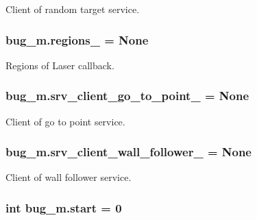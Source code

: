 Client of random target service. 

\subsubsection[{\texorpdfstring{regions\+\_\+}{regions_}}]{\setlength{\rightskip}{0pt plus 5cm}bug\+\_\+m.\+regions\+\_\+ = None}\hypertarget{namespacebug__m_ac9d4d95c034fca5a2b5d08ea845bbfcb}{}\label{namespacebug__m_ac9d4d95c034fca5a2b5d08ea845bbfcb}


Regions of Laser callback. 

\subsubsection[{\texorpdfstring{srv\+\_\+client\+\_\+go\+\_\+to\+\_\+point\+\_\+}{srv_client_go_to_point_}}]{\setlength{\rightskip}{0pt plus 5cm}bug\+\_\+m.\+srv\+\_\+client\+\_\+go\+\_\+to\+\_\+point\+\_\+ = None}\hypertarget{namespacebug__m_abd32bbd25b55f71e56505e72ba56c2f6}{}\label{namespacebug__m_abd32bbd25b55f71e56505e72ba56c2f6}


Client of go to point service. 

\subsubsection[{\texorpdfstring{srv\+\_\+client\+\_\+wall\+\_\+follower\+\_\+}{srv_client_wall_follower_}}]{\setlength{\rightskip}{0pt plus 5cm}bug\+\_\+m.\+srv\+\_\+client\+\_\+wall\+\_\+follower\+\_\+ = None}\hypertarget{namespacebug__m_af40e8063430e5b54ef2f3f8368338744}{}\label{namespacebug__m_af40e8063430e5b54ef2f3f8368338744}


Client of wall follower service. 

\subsubsection[{\texorpdfstring{start}{start}}]{\setlength{\rightskip}{0pt plus 5cm}int bug\+\_\+m.\+start = 0}\hypertarget{namespacebug__m_a344bbe115cc5a0f27c601941b64f60b0}{}\label{namespacebug__m_a344bbe115cc5a0f27c601941b64f60b0}


